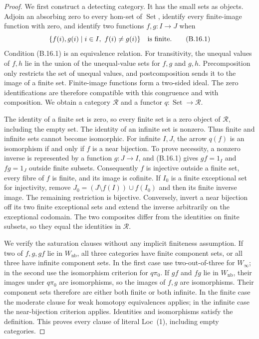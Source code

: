 \begin{proof}
We first construct a detecting category. It has the small sets as
objects. Adjoin an absorbing zero to every hom-set of
$\operatorname{Set}$, identify every finite-image function with zero,
and identify two functions $f,g:I\to J$ when
\[
 \{f(i),g(i)\mid i\in I,\ f(i)\ne g(i)\}
 \quad\hbox{is finite}.
\tag{B.16.1}
\]
Condition (B.16.1) is an equivalence relation. For transitivity, the
unequal values of $f,h$ lie in the union of the unequal-value sets
for $f,g$ and $g,h$. Precomposition only restricts the set of unequal
values, and postcomposition sends it to the image of a finite set.
Finite-image functions form a two-sided ideal. The zero identifications
are therefore compatible with this congruence and with composition.
We obtain a category $\mathscr R$ and a functor
$q:\operatorname{Set}\to\mathscr R$.

The identity of a finite set is zero, so every finite set is a zero
object of $\mathscr R$, including the empty set. The identity of an
infinite set is nonzero. Thus finite and infinite sets cannot become
isomorphic. For infinite $I,J$, the arrow $q(f)$ is an isomorphism
if and only if $f$ is a near bijection. To prove necessity, a nonzero
inverse is represented by a function $g:J\to I$, and (B.16.1) gives
$gf=1_I$ and $fg=1_J$ outside finite subsets. Consequently $f$ is
injective outside a finite set, every fibre of $f$ is finite, and
its image is cofinite. If $I_0$ is a finite exceptional set for
injectivity, remove
$J_0=(J\setminus f(I))\cup f(I_0)$ and then its finite inverse image.
The remaining restriction is bijective. Conversely, invert a near
bijection off its two finite exceptional sets and extend the inverse
arbitrarily on the exceptional codomain. The two composites differ
from the identities on finite subsets, so they equal the identities
in $\mathscr R$.

We verify the saturation clauses without any implicit finiteness
assumption. If two of $f,g,gf$ lie in $W_{\mathrm{nb}}$, all three
categories have finite component sets, or all three have infinite
component sets. In the first case use two-out-of-three for
$W_\infty$; in the second use the isomorphism criterion for $q\pi_0$.
If $gf$ and $fg$ lie in $W_{\mathrm{nb}}$, their images under
$q\pi_0$ are isomorphisms, so the images of $f,g$ are isomorphisms.
Their component sets therefore are either both finite or both
infinite. In the finite case the moderate clause for weak homotopy
equivalences applies; in the infinite case the near-bijection
criterion applies. Identities and isomorphisms satisfy the definition.
This proves every clause of literal Loc~(1), including empty categories.


\end{proof}

